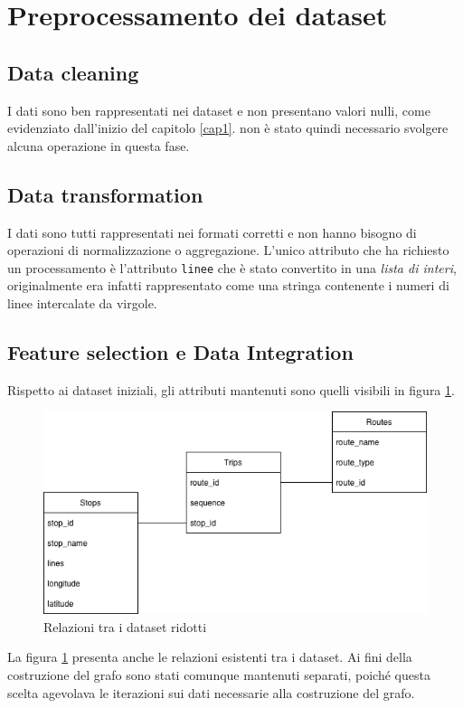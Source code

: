 \section{Preprocessamento dei dataset}

\subsection{Data cleaning}
I dati sono ben rappresentati nei dataset e non presentano valori nulli, come evidenziato dall'inizio del capitolo \ref{cap1}. non è stato quindi necessario svolgere alcuna operazione in questa fase.

\subsection{Data transformation}
I dati sono tutti rappresentati nei formati corretti e non hanno bisogno di operazioni di normalizzazione o aggregazione. L'unico attributo che ha richiesto un processamento è l'attributo \texttt{linee} che è stato convertito in una \textit{lista di interi}, originalmente era infatti rappresentato come una stringa contenente i numeri di linee intercalate da virgole.

\subsection{Feature selection e Data Integration}

Rispetto ai dataset iniziali, gli attributi mantenuti sono quelli visibili in figura \ref{fig:data integration}.

\vspace{1em}
\begin{figure}[h!]
    \centering
    \includegraphics[width=0.7\linewidth]{Immagini/Capitoli/cap1/data_integration.png}
    \caption{Relazioni tra i dataset ridotti}
    \label{fig:data integration}
\end{figure}
\vspace{1em}

La figura \ref{fig:data integration} presenta anche le relazioni esistenti tra i dataset. Ai fini della costruzione del grafo sono stati comunque mantenuti separati, poiché questa scelta agevolava le iterazioni sui dati necessarie alla costruzione del grafo.